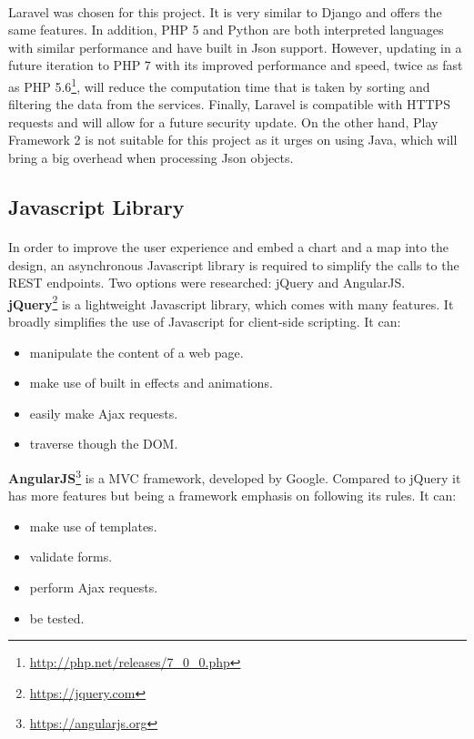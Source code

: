 \documentclass{l4proj}
\begin{document}
\paragraph{}
Laravel was chosen for this project. It is very similar to Django and offers the same features. In addition, PHP 5 and Python are both interpreted languages with similar performance and have built in Json support. However, updating in a future iteration to PHP 7 with its improved performance and speed, twice as fast as PHP 5.6\footnote{\url{http://php.net/releases/7_0_0.php}}, will reduce the computation time that is taken by sorting and filtering the data from the services. Finally, Laravel is compatible with HTTPS requests and will allow for a future security update. On the other hand, Play Framework 2 is not suitable for this project as it urges on using Java, which will bring a big overhead when processing Json objects. 


\subsection{Javascript Library}
\paragraph{}
In order to improve the user experience and embed a chart and a map into the design, an asynchronous Javascript library is required to simplify the calls to the REST endpoints. Two options were researched: jQuery and AngularJS.
\\\hspace*{7mm}\textbf{jQuery}\footnote{\url{https://jquery.com}} is a lightweight Javascript library, which comes with many features. It broadly simplifies the use of Javascript for client-side scripting. It can:
\begin{multicols}{2}
	\begin{itemize}
		\item manipulate the content of a web page.
		\item make use of built in effects and animations.
		\item easily make Ajax requests.
		\item traverse though the DOM.
	\end{itemize} 
\end{multicols}
\textbf{AngularJS}\footnote{\url{https://angularjs.org}} is a MVC framework, developed by Google. Compared to jQuery it has more features but being a framework emphasis on following its rules. It can:
\begin{multicols}{2}
	\begin{itemize}
		\item make use of templates.
		\item validate forms.
		\item perform Ajax requests.
		\item be tested.
	\end{itemize} 
\end{multicols}
\end{document}
